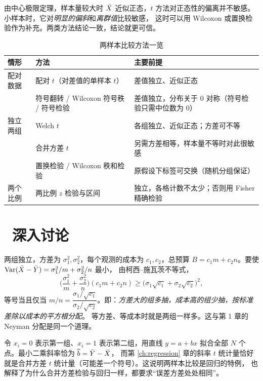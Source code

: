 \begin{intuition}[$t$ 方法有多稳健]
由中心极限定理，样本量较大时 $\bar{X}$ 近似正态，$t$ 方法对正态性的偏离并不敏感。小样本时，它对\emph{明显的偏斜}和\emph{离群值}比较敏感，
这时可以用 Wilcoxon 或置换检验作为补充。两类方法结论一致，结论就更可信。
\end{intuition}

\begin{table}[H]
\centering\small
\caption{两样本比较方法一览}\label{tab:twomethods}
\begin{tabularx}{\linewidth}{l l X}
\toprule
情形 & 方法 & 主要前提 \\
\midrule
配对数据 & 配对 $t$（对差值的单样本 $t$） & 差值独立、近似正态 \\
 & 符号翻转 / Wilcoxon 符号秩 / 符号检验 & 差值独立，分布关于 0 对称（符号检验只需中位数为 0） \\
独立两组 & Welch $t$ & 各组独立、近似正态；方差可不等 \\
 & 合并方差 $t$ & 另需方差相等，样本量不等时对此很敏感 \\
 & 置换检验 / Wilcoxon 秩和检验 & 原假设下标签可交换（随机分组保证） \\
两个比例 & 两比例 $z$ 检验与区间 & 独立，各格计数不太少；否则用 Fisher 精确检验 \\
\bottomrule
\end{tabularx}
\end{table}

\section{\starmark\ 深入讨论}

\begin{deeper}[固定预算下怎样分配样本量]
两组独立，方差为 $\sigma_1^2,\sigma_2^2$，每个观测的成本为 $c_1,c_2$，总预算 $B=c_1m+c_2n$。要使 $\operatorname{Var}(\bar{X}-\bar{Y})=\sigma_1^2/m+\sigma_2^2/n$ 最小，
由柯西–施瓦茨不等式，
\[
\Big(\frac{\sigma_1^2}{m}+\frac{\sigma_2^2}{n}\Big)(c_1m+c_2n)\ge\big(\sigma_1\sqrt{c_1}+\sigma_2\sqrt{c_2}\big)^2,
\]
等号当且仅当 $m/n=\dfrac{\sigma_1/\sqrt{c_1}}{\sigma_2/\sqrt{c_2}}$。即：\emph{方差大的组多抽，成本高的组少抽，按标准差除以成本的平方根分配}。
等方差、等成本时就是两组一样多。这与第 1 章的 Neyman 分配是同一个道理。
\end{deeper}

\begin{deeper}
令 $x_i=0$ 表示第一组、$x_i=1$ 表示第二组，用直线 $y=a+bx$ 拟合全部 $N$ 个点。最小二乘斜率恰为 $\widehat{b}=\bar{Y}-\bar{X}$，
而第 \ref{ch:regression} 章的斜率 $t$ 统计量恰好就是合并方差 $t$ 统计量（可能差一个符号）。这说明两样本比较是回归的特例，
也解释了为什么合并方差检验与回归一样，都要求“误差方差处处相同”。
\end{deeper}

